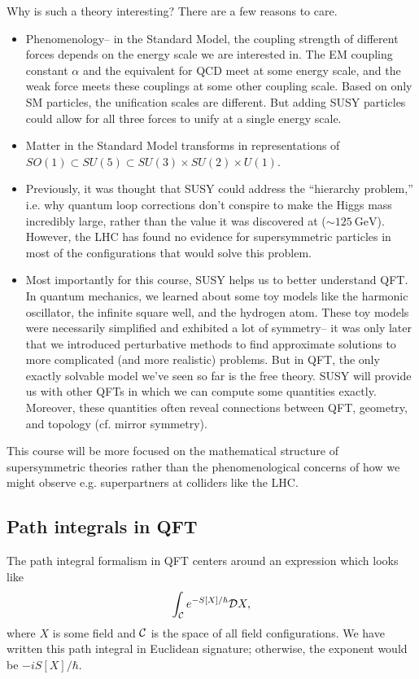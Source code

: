 Why is such a theory interesting? There are a few reasons to care.
\begin{itemize}
    \item Phenomenology-- in the Standard Model, the coupling strength of different forces depends on the energy scale we are interested in. The EM coupling constant $\alpha$ and the equivalent for QCD meet at some energy scale, and the weak force meets these couplings at some other coupling scale. Based on only SM particles, the unification scales are different. But adding SUSY particles could allow for all three forces to unify at a single energy scale.
    \item Matter in the Standard Model transforms in representations of $SO(1)\subset SU(5) \subset SU(3)\times SU(2) \times U(1)$.
    \item Previously, it was thought that SUSY could address the ``hierarchy problem,'' i.e. why quantum loop corrections don't conspire to make the Higgs mass incredibly large, rather than the value it was discovered at ($\sim \SI{125}{\giga\eV}$). However, the LHC has found no evidence for supersymmetric particles in most of the configurations that would solve this problem.
    \item Most importantly for this course, SUSY helps us to better understand QFT. In quantum mechanics, we learned about some toy models like the harmonic oscillator, the infinite square well, and the hydrogen atom. These toy models were necessarily simplified and exhibited a lot of symmetry-- it was only later that we introduced perturbative methods to find approximate solutions to more complicated (and more realistic) problems. But in QFT, the only exactly solvable model we've seen so far is the free theory. SUSY will provide us with other QFTs in which we can compute some quantities exactly. Moreover, these quantities often reveal connections between QFT, geometry, and topology (cf. mirror symmetry).
\end{itemize}
This course will be more focused on the mathematical structure of supersymmetric theories rather than the phenomenological concerns of how we might observe e.g. superpartners at colliders like the LHC.

\subsection*{Path integrals in QFT} The path integral formalism in QFT centers around an expression which looks like
\begin{equation*}
    \int_{\mathcal{C}} e^{-S[X]/\hbar}\mathcal{D} X,
\end{equation*}
where $X$ is some field and $\mathcal{C}$ is the space of all field configurations. We have written this path integral in Euclidean signature; otherwise, the exponent would be $-iS[X]/\hbar$.

